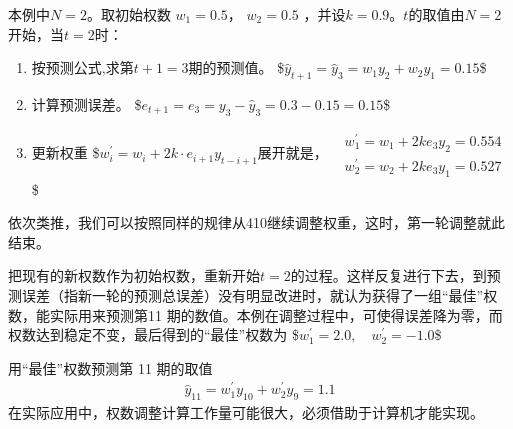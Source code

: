 \documentclass[letterpaper,10pt,english]{sphinxmanual}
\begin{document}
本例中\(N = 2\)。取初始权数 \(w_1 = 0.5\)， \(w_2 = 0.5\) ，并设\(k = 0.9\)。\(t\)的取值由\(N = 2\)开始，当\(t=2\)时：
\begin{enumerate}
%
\item {} 
按预测公式,求第\(t +1= 3\)期的预测值。
\$\(
\hat{y}_{t+1}=\hat{y}_{3}=w_{1} y_{2}+w_{2} y_{1}=0.15
\)\$

\item {} 
计算预测误差。
\$\(
e_{t+1}=e_{3}=y_{3}-\hat{y}_{3}=0.3-0.15=0.15
\)\$

\item {} 
更新权重
\$\(
w_{i}^{\prime}=w_{i}+2 k \cdot e_{i+1} y_{t-i+1}
\)\(
展开就是，
\)\(
\begin{aligned}
&w_{1}^{\prime}=w_{1}+2 k e_{3} y_{2}=0.554\\
&w_{2}^{\prime}=w_{2}+2 k e_{3} y_{1}=0.527
\end{aligned}
\)\$

\end{enumerate}

依次类推，我们可以按照同样的规律从4\sphinxhyphen{}10继续调整权重，这时，第一轮调整就此结束。

把现有的新权数作为初始权数，重新开始\(t = 2\)的过程。这样反复进行下去，到预测误差（指新一轮的预测总误差）没有明显改进时，就认为获得了一组“最佳”权数，能实际用来预测第11 期的数值。本例在调整过程中，可使得误差降为零，而权数达到稳定不变，最后得到的“最佳”权数为
\$\(
w_{1}^{\prime}=2.0, \quad w_{2}^{\prime}=-1.0
\)\$

用“最佳”权数预测第 11 期的取值
\begin{equation*}
\begin{split}
\hat{y}_{11}=w_{1}^{\prime} y_{10}+w_{2}^{\prime} y_{9}=1.1
\end{split}
\end{equation*}
在实际应用中，权数调整计算工作量可能很大，必须借助于计算机才能实现。
\end{document}
